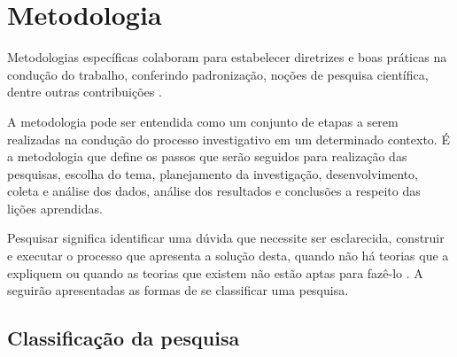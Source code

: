 \chapter{Metodologia}

Metodologias específicas colaboram para estabelecer diretrizes e boas práticas na condução do trabalho, conferindo padronização, noções de pesquisa científica, dentre outras contribuições \cite{Wohlin:2000}.

A metodologia pode ser entendida como um conjunto de etapas a serem realizadas na condução do processo investigativo em um determinado contexto. É a metodologia que define os passos que serão seguidos para realização das pesquisas, escolha do tema, planejamento da investigação, desenvolvimento, coleta e análise dos dados, análise dos resultados e conclusões a respeito das lições aprendidas\cite{Moresi:2003}.

Pesquisar significa identificar uma dúvida que necessite ser esclarecida, construir e executar o processo que apresenta a solução desta, quando não há teorias que a expliquem ou quando as teorias que existem não estão aptas para fazê-lo \cite{Koche:1997}. A seguirão apresentadas as formas de se classificar uma pesquisa.

\section{Classificação da pesquisa}

